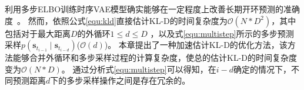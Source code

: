 利用多步ELBO训练时序VAE模型确实能够在一定程度上改善长期开环预测的准确度~\cite{Hafner2019}。
然而，依照公式\eqref{equ:kld}直接估计KL-D的时间复杂度为$\mathcal{O}(N*D^2)$，其中包括对于最大距离$D$的外循环$1\leq d \leq D$ ，以及式\eqref{equ:multistep}所示的多步预测采样$p\left(\boldsymbol{s}_{t_{i-1}} \mid \boldsymbol{s}_{t_{i-d}}\right)$($\mathcal{O}(d)$)。
本章提出了一种加速估计KL-D的优化方法，该方法能够合并外循环和多步采样过程的计算复杂度，使总的估计KL-D的时间复杂度变为$\mathcal{O}(N*D)$。
通过分析式\eqref{equ:multistep}可以得知，在$i-d$确定的情况下，不同预测距离$d$下的多步采样操作之间是存在冗余的。
